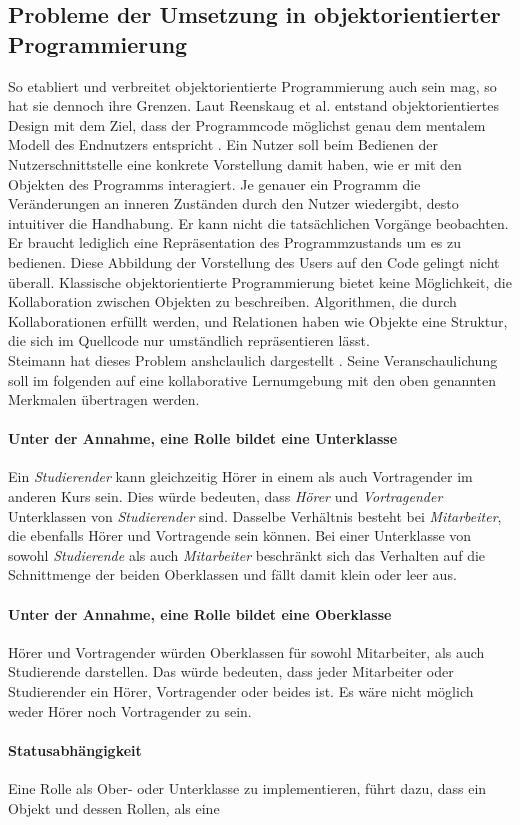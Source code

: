 \documentclass[conference]{IEEEtran}
\begin{document}
	
\subsection{Probleme der Umsetzung in objektorientierter Programmierung}  
So etabliert und verbreitet objektorientierte Programmierung auch sein mag, so hat sie dennoch ihre Grenzen. Laut Reenskaug et al. entstand objektorientiertes Design mit dem Ziel, dass der Programmcode möglichst genau dem mentalem Modell des Endnutzers entspricht \cite{reenskaug2009dci}. Ein Nutzer soll beim Bedienen der Nutzerschnittstelle eine konkrete Vorstellung damit haben, wie er mit den Objekten des Programms interagiert. Je genauer ein Programm die Veränderungen an inneren Zuständen durch den Nutzer wiedergibt, desto intuitiver die Handhabung. Er kann nicht die tatsächlichen Vorgänge beobachten. Er braucht lediglich eine Repräsentation des Programmzustands um es zu bedienen. Diese Abbildung der Vorstellung des Users auf den Code gelingt nicht überall. Klassische objektorientierte Programmierung bietet keine Möglichkeit, die Kollaboration zwischen Objekten zu beschreiben. Algorithmen, die durch Kollaborationen erfüllt werden, und Relationen haben wie Objekte eine Struktur, die sich im Quellcode nur umständlich repräsentieren lässt. \\ Steimann hat dieses Problem anshclaulich dargestellt \cite{steimann2000representation}. Seine Veranschaulichung soll im folgenden auf eine kollaborative Lernumgebung mit den oben genannten Merkmalen übertragen werden. \paragraph{Unter der Annahme, eine Rolle bildet eine Unterklasse} Ein \textit{Studierender} kann gleichzeitig Hörer in einem als auch Vortragender im anderen Kurs sein. Dies würde bedeuten, dass \textit{Hörer} und \textit{Vortragender} Unterklassen von \textit{Studierender} sind. Dasselbe Verhältnis besteht bei \textit{Mitarbeiter}, die ebenfalls Hörer und Vortragende sein können. Bei einer Unterklasse von sowohl \textit{Studierende} als auch \textit{Mitarbeiter} beschränkt sich das Verhalten auf die Schnittmenge der beiden Oberklassen und fällt damit klein oder leer aus.\paragraph{Unter der Annahme, eine Rolle bildet eine Oberklasse} Hörer und Vortragender würden Oberklassen für sowohl Mitarbeiter, als auch Studierende darstellen. Das würde bedeuten, dass jeder Mitarbeiter oder Studierender ein Hörer, Vortragender oder beides ist. Es wäre nicht möglich weder Hörer noch Vortragender zu sein. \paragraph{Statusabhängigkeit} Eine Rolle als Ober- oder Unterklasse zu implementieren, führt dazu, dass ein Objekt und dessen Rollen, als eine 
\end{document}
